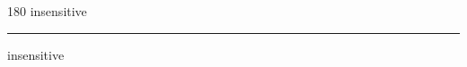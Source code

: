 
\begin{frame}
\begin{center}
\begin{turn}{180}
{\fontsize{2.5cm}{1em}\selectfont insensitive}
\end{turn}
\vspace{1em}\par  
\hrule
\vspace{1em}\par  
{\fontsize{2.5cm}{1em}\selectfont insensitive}
\end{center}
\end{frame}
